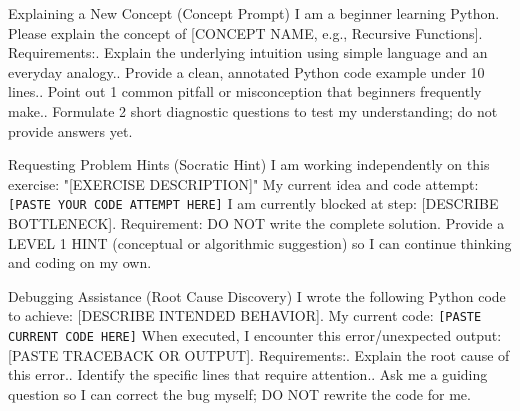 \documentclass[11pt,a4paper]{article}
\begin{document}
\begin{promptbox}{Explaining a New Concept (Concept Prompt)}
\small
I am a beginner learning Python. Please explain the concept of [CONCEPT NAME, e.g., Recursive Functions].\newline
Requirements:. Explain the underlying intuition using simple language and an everyday analogy.. Provide a clean, annotated Python code example under 10 lines.. Point out 1 common pitfall or misconception that beginners frequently make.. Formulate 2 short diagnostic questions to test my understanding; do not provide answers yet.
\end{promptbox}

\begin{promptbox}{Requesting Problem Hints (Socratic Hint)}
\small
I am working independently on this exercise: "[EXERCISE DESCRIPTION]"\newline
My current idea and code attempt:\newline
\texttt{[PASTE YOUR CODE ATTEMPT HERE]}\newline
I am currently blocked at step: [DESCRIBE BOTTLENECK].\newline
Requirement: DO NOT write the complete solution. Provide a LEVEL 1 HINT (conceptual or algorithmic suggestion) so I can continue thinking and coding on my own.
\end{promptbox}

\begin{promptbox}{Debugging Assistance (Root Cause Discovery)}
\small
I wrote the following Python code to achieve: [DESCRIBE INTENDED BEHAVIOR].\newline
My current code:\newline
\texttt{[PASTE CURRENT CODE HERE]}\newline
When executed, I encounter this error/unexpected output: [PASTE TRACEBACK OR OUTPUT].\newline
Requirements:. Explain the root cause of this error.. Identify the specific lines that require attention.. Ask me a guiding question so I can correct the bug myself; DO NOT rewrite the code for me.
\end{promptbox}
\end{document}
